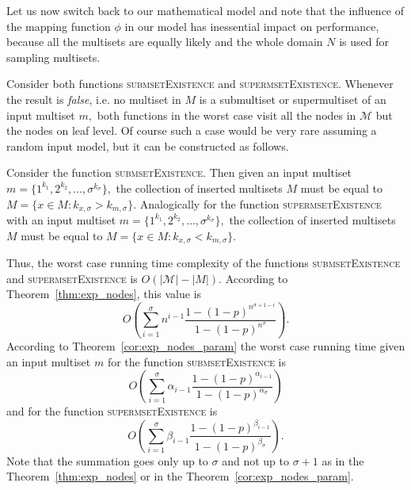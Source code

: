 \documentclass[10pt,letterpaper]{article}
\begin{document}
Let us now switch back to our mathematical model and note that the influence 
of the mapping function $\phi$ in our model has inessential impact on performance, 
because all the multisets are equally likely and the whole domain $N$ is used for 
sampling multisets. 

Consider both functions \textsc{submsetExistence} and \textsc{supermsetExistence}. 
Whenever the result is \emph{false}, i.e. no multiset in $M$ is 
a submultiset or supermultiset of an input multiset $m,$ both functions in the 
worst case visit all the nodes in $\mathcal{M}$ but the nodes on leaf level. 
Of course such a case would be very rare assuming a random input model, but 
it can be constructed as follows. 

Consider the function \textsc{submsetExistence}. Then given an input multiset 
$m = \{ 1^{k_1}, 2^{k_2}, \ldots, \sigma^{k_\sigma} \},$ the collection of inserted 
multisets $M$ must be equal to $M = \{ x\in M : k_{x,\sigma} > k_{m,\sigma} \}.$ 
Analogically for the function \textsc{supermsetExistence} with an input multiset 
$m = \{ 1^{k_1}, 2^{k_2}, \ldots, \sigma^{k_\sigma} \},$ the collection of inserted 
multisets $M$ must be equal to $M = \{ x\in M : k_{x,\sigma} < k_{m,\sigma} \}.$ 

Thus, the worst case running time complexity of the functions 
\textsc{submsetExistence} and \textsc{supermsetExistence} is $O(|\mathcal{M}| - |M|).$ 
According to Theorem~\ref{thm:exp_nodes}, this value is 
\begin{equation*}
O(\sum_{i=1}^{\sigma} n^{i-1} \frac{1-(1-p)^{n^{\sigma +1 -i}}}{1-(1-p)^{n^{\sigma}}}).
\end{equation*}
According to Theorem~\ref{cor:exp_nodes_param} the worst case running 
time given an input multiset $m$ for the function \textsc{submsetExistence} is 
\begin{equation*}
O(\sum_{i=1}^{\sigma} \alpha_{i-1} \frac{1-(1-p)^{\alpha_{i-1}}}{1-(1-p)^{\alpha_{\sigma}}})
\end{equation*}
and for the function \textsc{supermsetExistence} is 
\begin{equation*}
O(\sum_{i=1}^{\sigma} \beta_{i-1} \frac{1-(1-p)^{\beta_{i-1}}}{1-(1-p)^{\beta_{\sigma}}}).
\end{equation*}
Note that the summation goes only up to $\sigma$ and not up to $\sigma + 1$ as 
in the Theorem~\ref{thm:exp_nodes} or in the Theorem~\ref{cor:exp_nodes_param}.
\end{document}
